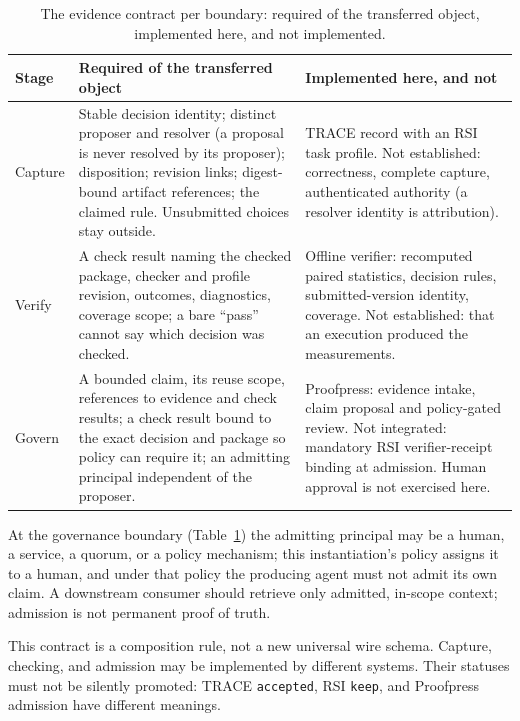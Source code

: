 \documentclass[conference]{IEEEtran}
\begin{document}
\begin{table}[t]
\caption{The evidence contract per boundary: required of the transferred object, implemented here, and not implemented.}
\label{tab:framework}
\centering\footnotesize
\setlength{\tabcolsep}{4pt}
\begin{tabular}{p{}p{}p{}}
\toprule
Stage & Required of the transferred object & Implemented here, and not\\
\midrule
Capture & Stable decision identity; distinct proposer and resolver (a proposal is never resolved by its proposer); disposition; revision links; digest-bound artifact references; the claimed rule. Unsubmitted choices stay outside. & TRACE record with an RSI task profile. Not established: correctness, complete capture, authenticated authority (a resolver identity is attribution).\\
Verify & A check result naming the checked package, checker and profile revision, outcomes, diagnostics, coverage scope; a bare ``pass'' cannot say which decision was checked. & Offline verifier: recomputed paired statistics, decision rules, submitted-version identity, coverage. Not established: that an execution produced the measurements.\\
Govern & A bounded claim, its reuse scope, references to evidence and check results; a check result bound to the exact decision and package so policy can require it; an admitting principal independent of the proposer. & Proofpress: evidence intake, claim proposal and policy-gated review. Not integrated: mandatory RSI verifier-receipt binding at admission. Human approval is not exercised here.\\
\bottomrule
\end{tabular}
\end{table}

At the governance boundary (Table~\ref{tab:framework}) the admitting principal may be a human, a service, a quorum, or a policy mechanism; this instantiation's policy assigns it to a human, and under that policy the producing agent must not admit its own claim. A downstream consumer should retrieve only admitted, in-scope context; admission is not permanent proof of truth.

This contract is a composition rule, not a new universal wire schema. Capture, checking, and admission may be implemented by different systems. Their statuses must not be silently promoted: TRACE \texttt{accepted}, RSI \texttt{keep}, and Proofpress admission have different meanings.
\end{document}
